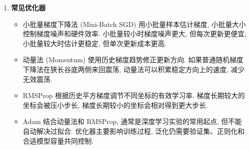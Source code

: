 \documentclass{../nndlcourse}
\begin{document}
\begin{enumerate}
    \item \textbf{常见优化器}
    \begin{itemize}
        \item 小批量梯度下降法 (Mini-Batch SGD) 用小批量样本估计梯度, 小批量大小控制梯度噪声和硬件效率. 小批量较小时梯度噪声更大, 但每次更新更便宜; 小批量较大时估计更稳定, 但单次更新成本更高.
        \item 动量法 (Momentum) 使用历史梯度趋势修正更新方向. 如果普通随机梯度下降法在狭长谷底两侧来回震荡, 动量法可以积累稳定方向上的速度, 减少无效震荡.
        \item RMSProp 根据历史平方梯度调节不同坐标的有效学习率. 梯度长期较大的坐标会被压小步长, 梯度长期较小的坐标会相对得到更大步长.
        \item Adam 结合动量法和 RMSProp, 通常是深度学习实验的常用起点, 但不能自动解决过拟合. 优化器主要影响训练过程, 泛化仍需要验证集、正则化和合适模型容量共同控制.
    \end{itemize}


\end{enumerate}
\end{document}
